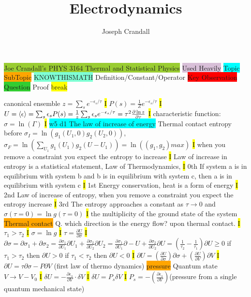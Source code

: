 \documentclass[fontsize=4pt]{scrartcl}
\title{Electrodynamics}
\author{Joseph Crandall}
\begin{document}
\colorbox{YellowGreen}{Joe Crandall's PHYS 3164 Thermal and Statistical Physics}
\colorbox{Thistle}{Used Heavily}
\colorbox{Cyan}{Topic}
\colorbox{Orange}{SubTopic}
\colorbox{Aquamarine}{KNOWTHISMATH}
\colorbox{RubineRed}{Definition/Constant/Operator}
\colorbox{Red}{Key Observation}
\colorbox{LimeGreen}{Question}
\colorbox{Periwinkle}{Proof}
\colorbox{Yellow}{break}

\colorbox{RubineRed}{canonical ensemble} 
$z = \sum_s e^{-\epsilon_s / \tau}$
\hl{I}
$P(s) = \frac{1}{Z}e^{-\epsilon_s / \tau}$
\hl{I}
$U = \expval{\epsilon} = \sum_s \epsilon_s P(s) = \frac{1}{z} \sum_s \epsilon_s e^{-\epsilon_s / \tau} = \tau^2 \frac{\partial \ln z}{\partial \tau}$
\hl{I}
characteristic function: $\sigma = \ln (\Gamma)$
\hl{I}
\colorbox{Cyan}{w5 d1 The law of increase of energy}
Thermal contact entropy before $\sigma_{I} = \ln(g_1(U_1,0)g_2(U_2,0))$,  $\sigma_{F} = \ln(\sum_{U_1} g_1(U_1)g_2(U-U_1)) = \ln((g_1,g_2)max)$
\hl{I}
when you remove a constraint you expect the entropy to increase
\hl{I}
Law of increase in entropy is a statistical statement, Law of Thermodynamics,
\hl{I} 
0th If system a is in equilibrium with system b and b is in equilibrium with system c, then a is in equilibrium with system c
\hl{I}
1st Energy conservation, heat is a form of energy
\hl{I}
2nd Law of increase of entropy, when you remove a constraint you expect the entropy increase
\hl{I}
3rd The entropy approaches a constant as $\tau \rightarrow 0$ and $\sigma (\tau = 0) = \ln g(\tau = 0)$
\hl{I}
the multiplicity of the ground state of the system
\colorbox{Orange}{Thermal contact}
Q. which direction is the energy flow? upon thermal contact. 
\hl{I}
$\tau_1 > \tau_2$
\hl{I}
$\sigma = \ln g$
\hl{I}
$\tau = \frac{\partial U}{\partial \sigma}$
\hl{I}
$\partial \sigma = \partial \sigma_1 + \partial \sigma_2 = \frac{\partial \sigma_1}{\partial U_1} \partial U_1+  \frac{\partial \sigma_2}{\partial U_2} \partial U_2 =\frac{\partial \sigma_1}{\partial U_1} \partial -U+  \frac{\partial \sigma_2}{\partial U_2} \partial U = (\frac{1}{\tau_2} - \frac{1}{\tau_1})\partial U \geq 0$ if $\tau_1 > \tau_2$ then $\partial U > 0$ if $\tau_1 < \tau_2$ then $\partial U < 0$
\hl{I}
$\partial U = (\frac{\partial U}{\partial \sigma}) \partial \sigma + (\frac{\partial U}{\partial V}) \partial V$
\hl{I}
$\partial U = \tau \partial \sigma - P \partial V$ (first law of thermo dynamics)
\colorbox{Orange}{pressure}
Quantum state $V \rightarrow V - V_0$
\hl{I}
$\delta U = -\frac{\partial \epsilon_s}{\partial V} \cdot \delta V$
\hl{I}
$\delta U = P_s \delta V$
\hl{I}
$P_s = -(\frac{\partial \epsilon_s}{\partial V}) $(pressure from a single quantum mechanical state)
\end{document}
